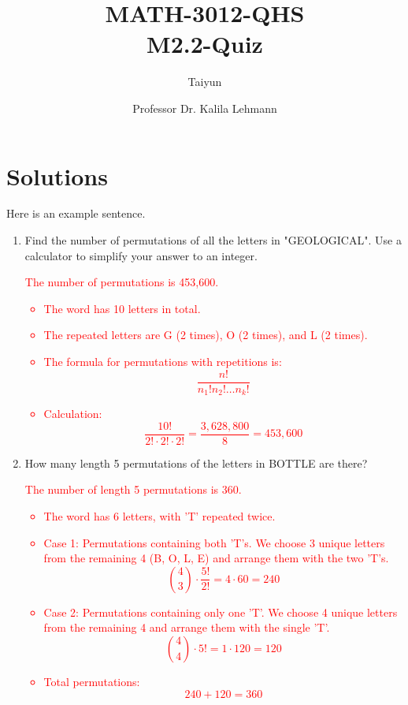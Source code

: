 \documentclass{article}
\author{Taiyun}
\title{MATH-3012-QHS \\ M2.2-Quiz}
\date{Professor Dr. Kalila Lehmann}
\begin{document}
\maketitle

\section*{Solutions}

Here is an example sentence. 

\begin{enumerate}
    \item Find the number of permutations of all the letters in "GEOLOGICAL". Use a calculator to simplify your answer to an integer.
    \par
    \textcolor{red}{The number of permutations is 453,600.
    \begin{itemize}
        \item The word has 10 letters in total.
        \item The repeated letters are G (2 times), O (2 times), and L (2 times).
        \item The formula for permutations with repetitions is:
        \[
        \frac{n!}{n_1! n_2! \dots n_k!}
        \]
        \item Calculation:
        \[
        \frac{10!}{2! \cdot 2! \cdot 2!} = \frac{3,628,800}{8} = 453,600
        \]
    \end{itemize}}

    \item How many length 5 permutations of the letters in BOTTLE are there?
    \par
    \textcolor{red}{The number of length 5 permutations is 360.
    \begin{itemize}
        \item The word has 6 letters, with 'T' repeated twice.
        \item Case 1: Permutations containing both 'T's. We choose 3 unique letters from the remaining 4 (B, O, L, E) and arrange them with the two 'T's.
        \[
        \binom{4}{3} \cdot \frac{5!}{2!} = 4 \cdot 60 = 240
        \]
        \item Case 2: Permutations containing only one 'T'. We choose 4 unique letters from the remaining 4 and arrange them with the single 'T'.
        \[
        \binom{4}{4} \cdot 5! = 1 \cdot 120 = 120
        \]
        \item Total permutations:
        \[
        240 + 120 = 360
        \]
    \end{itemize}}


\end{enumerate}
\end{document}
